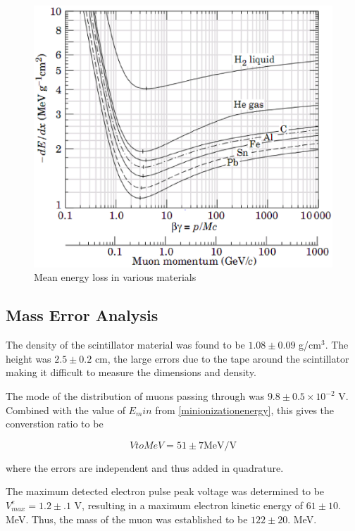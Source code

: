 \label{energy_loss}
\begin{figure}[h]
\begin{center}
\includegraphics[width = 130mm]{figures/energy_loss.eps}
\caption{\small{Mean energy loss in various materials \cite{yao.}}}
\label{figure:dEdx}
\end{center}
\end{figure}

\subsection{Mass Error Analysis}

The density of the scintillator material was found to be $1.08 \pm
0.09$ g/cm$^3$. The height was $2.5 \pm 0.2$ cm, the large errors due
to the tape around the scintillator making it difficult to measure the
dimensions and density.

The mode of the distribution of muons passing through was $9.8 \pm 0.5
\times 10^{-2}$ V.  Combined with the value of $E_min$ from
\ref{minionizationenergy}, this gives the converstion ratio to be

\begin{equation} VtoMeV = 51 \pm 7 \mathrm{ MeV/V} \end{equation}   

where the errors are independent and thus added in quadrature.

The maximum detected electron pulse peak voltage was determined to be
$V_{max}^e = 1.2 \pm .1$ V, resulting in a maximum electron kinetic
energy of $61\pm 10.$ MeV. Thus, the mass of the muon was established
to be $122 \pm 20.$ MeV. 
